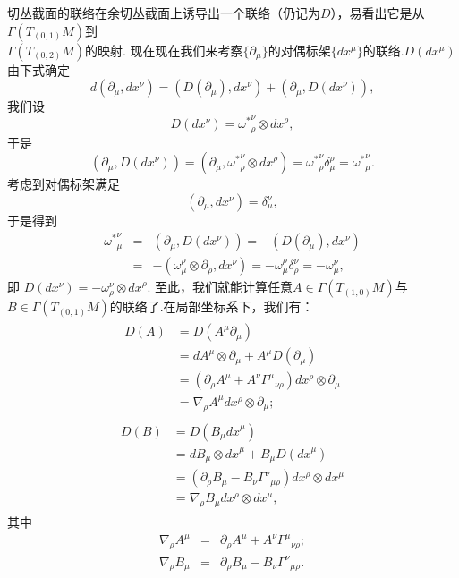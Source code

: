 		切丛截面的联络在余切丛截面上诱导出一个联络（仍记为$D$），易看出它是从$\varGamma(T_{(0,1)}M)$到\\$\varGamma(T_{(0,2)}M)$的映射.
		现在现在我们来考察$\{\partial_\mu\}$的对偶标架$\{dx^\mu\}$的联络.$D(dx^\mu)$由下式确定
		$$d\left(\partial_\mu,dx^\nu\right)=\left(D(\partial_\mu),dx^\nu\right)+\left(\partial_\mu,D(dx^\nu)\right),$$
		我们设
		$$D(dx^\nu)={\omega^*}^\nu_\rho\otimes{dx}^\rho,$$
		于是
		$$\left(\partial_\mu,D(dx^\nu)\right)=\left(\partial_\mu,{\omega^*}^\nu_\rho\otimes{dx}^\rho\right)={\omega^*}^\nu_\rho\delta^\rho_\mu={\omega^*}^\nu_\mu.$$
		考虑到对偶标架满足
		$$\left(\partial_\mu,dx^\nu\right)=\delta^\nu_\mu,$$ 
		于是得到
		\begin{eqnarray}
			{\omega^*}^\nu_\mu&=&\left(\partial_\mu,D(dx^\nu)\right)=-\left(D(\partial_\mu),dx^\nu\right)\\
				&=&-\left(\omega^\rho_\mu\otimes\partial_\rho,dx^\nu\right)=-{\omega}^\rho_\mu\delta^\nu_\rho=-{\omega}^\nu_\mu,
		\end{eqnarray}
		即
		$D(dx^\nu)=-{\omega}^\nu_\rho\otimes{dx}^\rho$.
		至此，我们就能计算任意$A\in \varGamma(T_{(1,0)}M)$与$B\in \varGamma(T_{(0,1)}M)$的联络了.在局部坐标系下，我们有：			
		\begin{eqnarray}
			\begin{split}
				D(A)&=D(A^\mu\partial_\mu)\\
				&=dA^\mu\otimes\partial_\mu+A^{\mu}D(\partial_\mu)\\
				&=(\partial_{\rho}A^\mu+A^{\nu}{\varGamma^\mu}_{\nu\rho})dx^\rho{\otimes}\partial_\mu\\
				&=\nabla_{\rho}A^{\mu}dx^\rho{\otimes}\partial_\mu;
			\end{split}
		\end{eqnarray}
		\begin{eqnarray}
			\begin{split}
				D(B)&=D(B_{\mu}{dx}^\mu)\\
				&=dB_\mu\otimes{dx}^\mu+B_{\mu}D({dx}^\mu)\\
				&=(\partial_{\rho}B_\mu-B_\nu{\varGamma^\nu}_{\mu\rho})dx^\rho{\otimes}dx^\mu\\
				&=\nabla_{\rho}B_{\mu}dx^\rho{\otimes}dx^\mu,
			\end{split}
		\end{eqnarray}
		其中
		\begin{eqnarray}
			\nabla_{\rho}A^\mu&=&\partial_{\rho}A^\mu+A^{\nu}{\varGamma^\mu}_{\nu\rho};\\
				\nabla_{\rho}B_{\mu}&=&\partial_{\rho}B_\mu-B_\nu{\varGamma^\nu}_{\mu\rho}.
		\end{eqnarray}							
